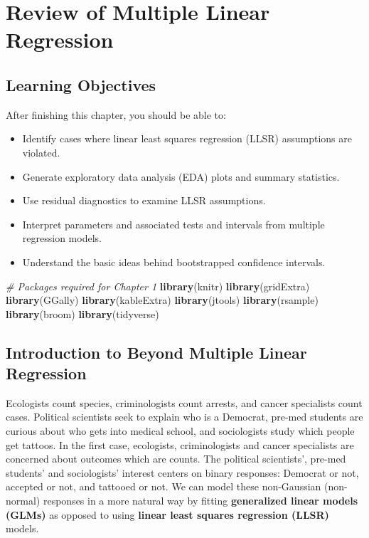 \documentclass[
]{krantz}
\newenvironment{Shaded}{\begin{snugshade}}{\end{snugshade}}
\newcommand{\CommentTok}[1]{\textcolor[rgb]{0.37,0.37,0.37}{\textit{#1}}}
\newcommand{\FunctionTok}[1]{\textcolor[rgb]{0.27,0.27,0.27}{\textbf{#1}}}
\newcommand{\NormalTok}[1]{#1}
\providecommand{\tightlist}{%
  \setlength{\itemsep}{0pt}\setlength{\parskip}{0pt}}
\begin{document}
\mainmatter

\chapter{Review of Multiple Linear Regression}\label{ch-MLRreview}

\section{Learning Objectives}\label{learning-objectives}

After finishing this chapter, you should be able to:

\begin{itemize}
\tightlist
\item
  Identify cases where linear least squares regression (LLSR) assumptions are violated.
\item
  Generate exploratory data analysis (EDA) plots and summary statistics.
\item
  Use residual diagnostics to examine LLSR assumptions.
\item
  Interpret parameters and associated tests and intervals from multiple regression models.
\item
  Understand the basic ideas behind bootstrapped confidence intervals.
\end{itemize}

\begin{Shaded}
\begin{Highlighting}[]
\CommentTok{\# Packages required for Chapter 1}
\FunctionTok{library}\NormalTok{(knitr) }
\FunctionTok{library}\NormalTok{(gridExtra)}
\FunctionTok{library}\NormalTok{(GGally)}
\FunctionTok{library}\NormalTok{(kableExtra)}
\FunctionTok{library}\NormalTok{(jtools)}
\FunctionTok{library}\NormalTok{(rsample)}
\FunctionTok{library}\NormalTok{(broom)}
\FunctionTok{library}\NormalTok{(tidyverse)    }
\end{Highlighting}
\end{Shaded}

\section{Introduction to Beyond Multiple Linear Regression}\label{introduction-to-beyond-multiple-linear-regression}

Ecologists count species, criminologists count arrests, and cancer specialists count cases. Political scientists seek to explain who is a Democrat, pre-med students are curious about who gets into medical school, and sociologists study which people get tattoos. In the first case, ecologists, criminologists and cancer specialists are concerned about outcomes which are counts. The political scientists', pre-med students' and sociologists' interest centers on binary responses: Democrat or not, accepted or not, and tattooed or not. We can model these non-Gaussian (non-normal) responses in a more natural way by fitting \textbf{generalized linear models (GLMs)} as opposed to using \textbf{linear least squares regression (LLSR)} models.
\end{document}
